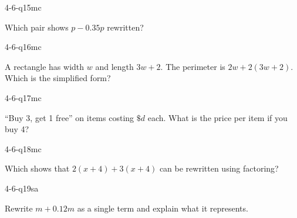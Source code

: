 \begin{practiceQuestion}{4-6-q15}{mc}
\begin{questionText}
Which pair shows $p - 0.35p$ rewritten?
\end{questionText}
\end{practiceQuestion}

\begin{practiceQuestion}{4-6-q16}{mc}
\begin{questionText}
A rectangle has width $w$ and length $3w + 2$. The perimeter is $2w + 2(3w + 2)$. Which is the simplified form?
\end{questionText}
\end{practiceQuestion}

\begin{practiceQuestion}{4-6-q17}{mc}
\begin{questionText}
``Buy 3, get 1 free'' on items costing $\$d$ each. What is the price per item if you buy 4?
\end{questionText}
\end{practiceQuestion}

\begin{practiceQuestion}{4-6-q18}{mc}
\begin{questionText}
Which shows that $2(x + 4) + 3(x + 4)$ can be rewritten using factoring?
\end{questionText}
\end{practiceQuestion}


\begin{practiceQuestion}{4-6-q19}{sa}
\begin{questionText}
Rewrite $m + 0.12m$ as a single term and explain what it represents.
\end{questionText}
\end{practiceQuestion}

